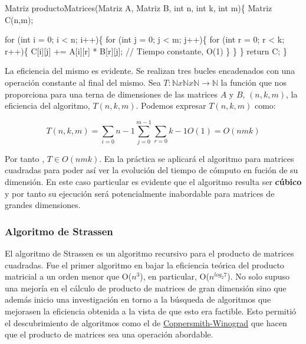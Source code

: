 \documentclass[]{article}
\newenvironment{Shaded}{\begin{snugshade}}{\end{snugshade}}
\newcommand{\KeywordTok}[1]{\textcolor[rgb]{0.94,0.87,0.69}{{#1}}}
\newcommand{\DataTypeTok}[1]{\textcolor[rgb]{0.87,0.87,0.75}{{#1}}}
\newcommand{\DecValTok}[1]{\textcolor[rgb]{0.86,0.86,0.80}{{#1}}}
\newcommand{\CommentTok}[1]{\textcolor[rgb]{0.50,0.62,0.50}{{#1}}}
\newcommand{\NormalTok}[1]{\textcolor[rgb]{0.80,0.80,0.80}{{#1}}}
\begin{document}
\begin{Shaded}
\begin{Highlighting}[]
\NormalTok{Matriz productoMatrices(Matriz A, Matriz B, }\DataTypeTok{int} \NormalTok{n, }\DataTypeTok{int} \NormalTok{k, }\DataTypeTok{int} \NormalTok{m)\{}
    \NormalTok{Matriz C(n,m);}

    \KeywordTok{for} \NormalTok{(}\DataTypeTok{int} \NormalTok{i = }\DecValTok{0}\NormalTok{; i < n; i++)\{}
        \KeywordTok{for} \NormalTok{(}\DataTypeTok{int} \NormalTok{j = }\DecValTok{0}\NormalTok{; j < m; j++)\{}
            \KeywordTok{for} \NormalTok{(}\DataTypeTok{int} \NormalTok{r = }\DecValTok{0}\NormalTok{; r < k; r++)\{}
                \NormalTok{C[i][j] += A[i][r] * B[r][j]; }\CommentTok{// Tiempo constante, O(1)}
            \NormalTok{\}}
        \NormalTok{\}}
    \NormalTok{\}}
    \KeywordTok{return} \NormalTok{C;}
\NormalTok{\}}
\end{Highlighting}
\end{Shaded}

La eficiencia del mismo es evidente. Se realizan tres bucles encadenados
con una operación constante al final del mismo. Sea
$T: \mathbb{N}x\mathbb{N}x\mathbb{N} \rightarrow \mathbb{N}$ la función
que nos proporciona para una terna de dimensiones de las matrices $A$ y
$B$, $(n,k,m)$, la eficiencia del algoritmo, $T(n,k,m)$. Podemos
expresar $T(n,k,m)$ como:

\[ T(n,k,m) =  \sum_{i=0}{n-1}\sum_{j=0}^{m-1}\sum_{r=0}{k-1}O(1) = O(n m k) \]

Por tanto , $T \in O(nmk)$. En la práctica se aplicará el algoritmo para
matrices cuadradas para poder así ver la evolución del tiempo de cómputo
en fución de su dimensión. En este caso particular es evidente que el
algoritmo resulta ser \textbf{cúbico} y por tanto su ejecución será
potencialmente inabordable para matrices de grandes dimensiones.

\subsubsection{Algoritmo de Strassen}\label{algoritmo-de-strassen}

El algoritmo de Strassen es un algoritmo recursivo para el producto de
matrices cuadradas. Fue el primer algoritmo en bajar la eficiencia
teórica del producto matricial a un orden menor que O($n^3$), en
particular, O($n^{log_{2}7}$). No solo supuso una mejoría en el cálculo
de producto de matrices de gran dimensión sino que además inicio una
investigación en torno a la búsqueda de algoritmos que mejorasen la
eficiencia obtenida a la vista de que esto era factible. Esto permitió
el descubrimiento de algoritmos como el de
\href{http://en.wikipedia.org/wiki/Coppersmith-Winograd_algorithm}{Coppersmith-Winograd}
que hacen que el producto de matrices sea una operación abordable.
\end{document}
